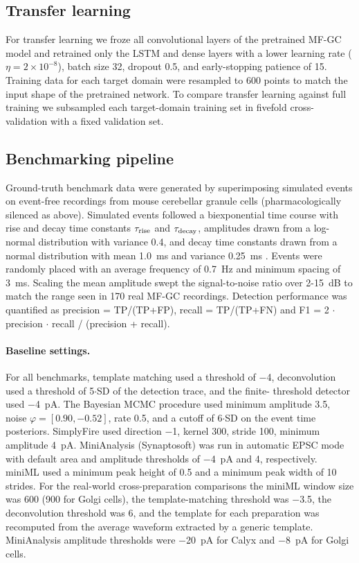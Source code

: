 \documentclass[11pt]{article}
\begin{document}
\subsection{Transfer learning}
For transfer learning we froze all convolutional layers of the pretrained
MF-GC model and retrained only the LSTM and dense layers with a lower
learning rate ($\eta = 2\times 10^{-8}$), batch size 32, dropout 0.5, and
early-stopping patience of 15. Training data for each target domain were
resampled to 600 points to match the input shape of the pretrained network.
To compare transfer learning against full training we subsampled each
target-domain training set in fivefold cross-validation with a fixed
validation set.

\subsection{Benchmarking pipeline}
Ground-truth benchmark data were generated by superimposing simulated events
on event-free recordings from mouse cerebellar granule cells
(pharmacologically silenced as above). Simulated events followed a
biexponential time course with rise and decay time constants $\tau_{\rm
rise}$ and $\tau_{\rm decay}$, amplitudes drawn from a log-normal distribution
with variance 0.4, and decay time constants drawn from a normal distribution
with mean 1.0~ms and variance 0.25~ms \citep{delvendahl2019mfgc}. Events
were randomly placed with an average frequency of 0.7~Hz and minimum
spacing of 3~ms. Scaling the mean amplitude swept the signal-to-noise ratio
over 2-15~dB to match the range seen in 170 real MF-GC recordings. Detection
performance was quantified as precision = TP/(TP+FP), recall = TP/(TP+FN)
and F1 = 2 $\cdot$ precision $\cdot$ recall / (precision + recall).

\paragraph{Baseline settings.}
For all benchmarks, template matching used a threshold of $-$4, deconvolution
used a threshold of 5$\cdot$SD of the detection trace, and the finite-
threshold detector used $-$4~pA. The Bayesian MCMC procedure
\citep{merel2016bayesian} used minimum amplitude 3.5, noise
$\varphi = [0.90, -0.52]$, rate 0.5, and a cutoff of 6$\cdot$SD on the event
time posteriors. SimplyFire \citep{mori2024simplyfire} used direction $-$1,
kernel 300, stride 100, minimum amplitude 4~pA. MiniAnalysis (Synaptosoft)
was run in automatic EPSC mode with default area and amplitude thresholds
of $-$4~pA and 4, respectively. miniML used a minimum peak height of 0.5
and a minimum peak width of 10 strides. For the real-world cross-preparation
comparisons the miniML window size was 600 (900 for Golgi cells), the
template-matching threshold was $-$3.5, the deconvolution threshold was 6,
and the template for each preparation was recomputed from the average
waveform extracted by a generic template. MiniAnalysis amplitude thresholds
were $-$20~pA for Calyx and $-$8~pA for Golgi cells.
\end{document}
